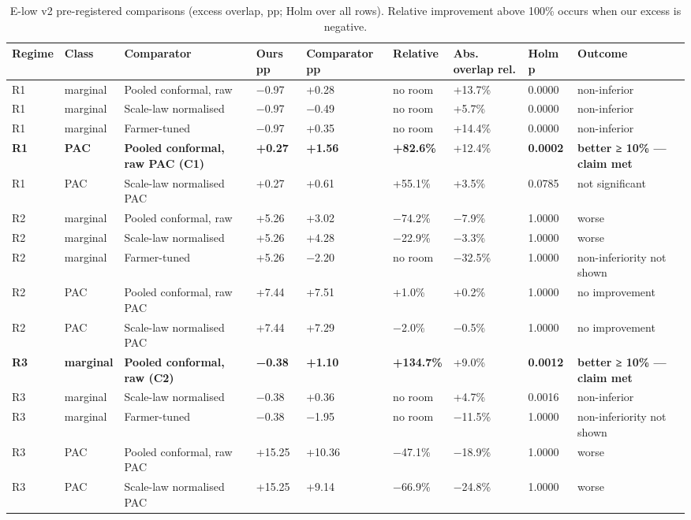 \documentclass[preprint,12pt,authoryear]{elsarticle}
\begin{document}
\begin{table}[!htbp]
\centering
\scriptsize
\renewcommand{\thetable}{S9}\caption{E-low v2 pre-registered comparisons (excess overlap, pp; Holm over all rows). Relative improvement above 100\% occurs when our excess is negative.}
\begin{adjustbox}{max width=\textwidth}
\begin{tabular}{@{}ll>{\raggedright\arraybackslash}p{15.0em}lll>{\raggedright\arraybackslash}p{7.0em}l>{\raggedright\arraybackslash}p{12.5em}@{}}
\toprule
\textbf{Regime} & \textbf{Class} & \textbf{Comparator} & \textbf{Ours pp} & \textbf{Comparator pp} & \textbf{Relative} & \textbf{Abs. overlap rel.} & \textbf{Holm p} & \textbf{Outcome} \\
\midrule
R1 & marginal & Pooled conformal, raw & −0.97 & +0.28 & no room & +13.7\% & 0.0000 & non-inferior \\
R1 & marginal & Scale-law normalised & −0.97 & −0.49 & no room & +5.7\% & 0.0000 & non-inferior \\
R1 & marginal & Farmer-tuned & −0.97 & +0.35 & no room & +14.4\% & 0.0000 & non-inferior \\
\textbf{R1} & \textbf{PAC} & \textbf{Pooled conformal, raw PAC (C1)} & \textbf{+0.27} & \textbf{+1.56} & \textbf{+82.6\%} & +12.4\% & \textbf{0.0002} & \textbf{better ≥ 10\% --- claim met} \\
R1 & PAC & Scale-law normalised PAC & +0.27 & +0.61 & +55.1\% & +3.5\% & 0.0785 & not significant \\
R2 & marginal & Pooled conformal, raw & +5.26 & +3.02 & −74.2\% & −7.9\% & 1.0000 & worse \\
R2 & marginal & Scale-law normalised & +5.26 & +4.28 & −22.9\% & −3.3\% & 1.0000 & worse \\
R2 & marginal & Farmer-tuned & +5.26 & −2.20 & no room & −32.5\% & 1.0000 & non-inferiority not shown \\
R2 & PAC & Pooled conformal, raw PAC & +7.44 & +7.51 & +1.0\% & +0.2\% & 1.0000 & no improvement \\
R2 & PAC & Scale-law normalised PAC & +7.44 & +7.29 & −2.0\% & −0.5\% & 1.0000 & no improvement \\
\textbf{R3} & \textbf{marginal} & \textbf{Pooled conformal, raw (C2)} & \textbf{−0.38} & \textbf{+1.10} & \textbf{+134.7\%} & +9.0\% & \textbf{0.0012} & \textbf{better ≥ 10\% --- claim met} \\
R3 & marginal & Scale-law normalised & −0.38 & +0.36 & no room & +4.7\% & 0.0016 & non-inferior \\
R3 & marginal & Farmer-tuned & −0.38 & −1.95 & no room & −11.5\% & 1.0000 & non-inferiority not shown \\
R3 & PAC & Pooled conformal, raw PAC & +15.25 & +10.36 & −47.1\% & −18.9\% & 1.0000 & worse \\
R3 & PAC & Scale-law normalised PAC & +15.25 & +9.14 & −66.9\% & −24.8\% & 1.0000 & worse \\
\bottomrule
\end{tabular}
\end{adjustbox}
\end{table}
\end{document}
